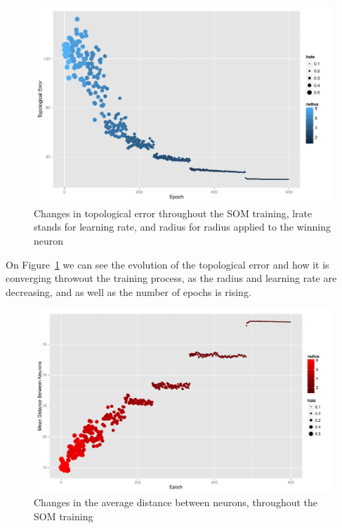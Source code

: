 \begin{figure}[h!]
  \includegraphics[scale=0.6]{./plots/som/topological_error.pdf}
  \caption{Changes in topological error throughout the SOM training, lrate stands for learning rate, and radius for radius applied to the winning neuron}
  \label{fig:top_error}
\end{figure}

On Figure~\ref{fig:top_error} we can see the evolution of the topological error and how it is converging throwout the training process, as the radius and learning rate are decreasing, and as well as the number of epochs is rising. 

\begin{figure}[h!]
  \centerline{\includegraphics[scale=0.6]{./plots/som/average_distance.pdf}}
  \caption{Changes in the average distance between neurons, throughout the SOM training}
  \label{avg_dist}
\end{figure}

